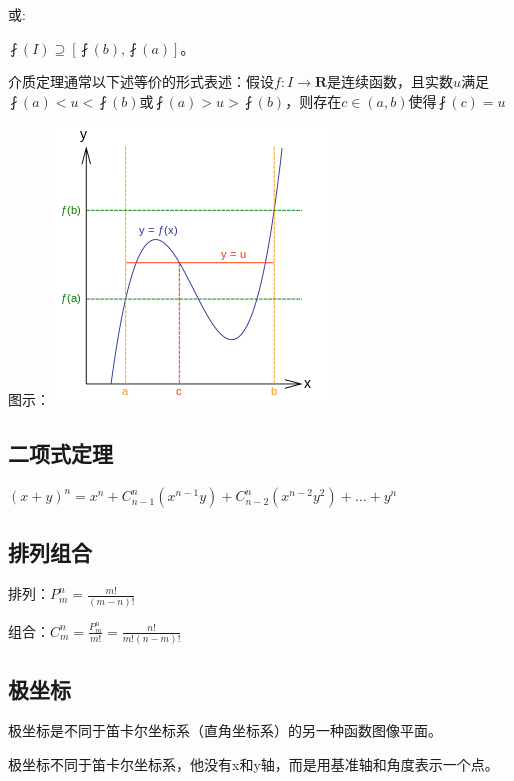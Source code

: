 \documentclass[UTF8]{ctexbook}
\newcommand{\mathCombination}[2]{C_{#1}^{#2}}
\newcommand{\mathPermutation}[2]{P_{#1}^{#2}}
\begin{document}
{{{或:

$\fint(I)\supseteq[\fint(b), \fint(a)]$。

介质定理通常以下述等价的形式表述：假设$f:I\rightarrow\mathbf{R}$是连续函数，且实数$u$满足$\fint(a)<u<\fint(b)$或$\fint(a)>u>\fint(b)$，则存在$c\in(a,b)$使得$\fint(c) = u$

图示：
\includegraphics{resources/Intermediatevaluetheorem.png}
}%

\subsection{二项式定理}{
  $(x + y)^n = x^n + \mathCombination{n - 1}{n}(x^{n-1} y) + \mathCombination{n - 2}{n}(x^{n-2} y^2) + \dots + y^n$
}%

\subsection{排列组合}{
  排列：$\mathPermutation{m}{n} = \frac{m!}{(m-n)!}$

  组合：$\mathCombination{m}{n} = \frac{\mathPermutation{m}{n}}{m!} = \frac{n!}{m!(n-m)!}$
}%

\subsection{极坐标}{
极坐标是不同于笛卡尔坐标系（直角坐标系）的另一种函数图像平面。

极坐标不同于笛卡尔坐标系，他没有x和y轴，而是用基准轴和角度表示一个点。

}}}
\end{document}
